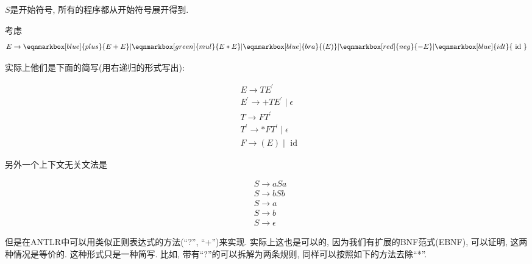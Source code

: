 \documentclass{ctexart}
\begin{document}
$S$是开始符号, 所有的程序都从开始符号展开得到. 

\begin{example}
    考虑
    \begin{equation*}
        E \rightarrow 
        \eqnmarkbox[blue]{plus}{E+E}
        |
        \eqnmarkbox[green]{mul}{E * E}
        |
        \eqnmarkbox[blue]{bra}{(E)}
        |
        \eqnmarkbox[red]{neg}{-E}
        |
        \eqnmarkbox[blue]{idt}{\text { id }}
    \end{equation*}

    实际上他们是下面的简写(用右递归的形式写出): 

    \begin{equation*}
        \begin{aligned}
        & E \rightarrow T E^{\prime} \\
        & E^{\prime} \rightarrow+T E^{\prime} \mid \epsilon \\
        & T \rightarrow F T^{\prime} \\
        & T^{\prime} \rightarrow * F T^{\prime} \mid \epsilon \\
        & F \rightarrow(E) \mid \text { id }
        \end{aligned}
    \end{equation*}

    另外一个上下文无关文法是

    \begin{equation*}
        \begin{aligned}
        & S \rightarrow a S a \\
        & S \rightarrow b S b \\
        & S \rightarrow a \\
        & S \rightarrow b \\
        & S \rightarrow \epsilon
        \end{aligned}
    \end{equation*}
    
\end{example}

但是在ANTLR中可以用类似正则表达式的方法(``?'', ``+'')来实现. 实际上这也是可以的, 因为我们有扩展的BNF范式(EBNF), 可以证明, 这两种情况是等价的. 这种形式只是一种简写. 比如, 带有``?''的可以拆解为两条规则, 同样可以按照如下的方法去除``*''. 
\end{document}
